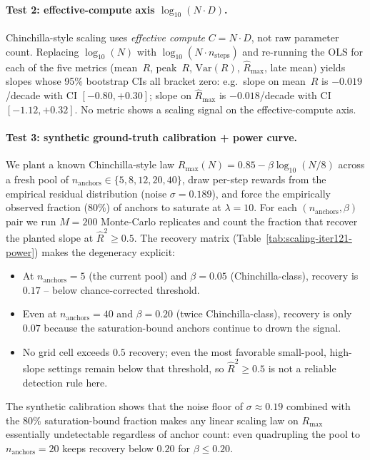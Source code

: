 \documentclass{article}
\providecommand{\tableref}[1]{Table~\ref{#1}}
\begin{document}
\paragraph{Test 2: effective-compute axis $\log_{10}(N \cdot D)$.}
\label{par:scaling-iter121-effcomp}
Chinchilla-style scaling uses \emph{effective compute}
$C = N \cdot D$, not raw parameter count.  Replacing $\log_{10}(N)$
with $\log_{10}(N \cdot n_{\text{steps}})$ and re-running the OLS
for each of the five metrics (mean~$R$, peak~$R$, $\mathrm{Var}(R)$,
$\hat R_{\max}$, late mean) yields slopes whose 95\% bootstrap CIs
all bracket zero: e.g.\ slope on mean~$R$ is $-0.019$/decade with
CI $[-0.80, +0.30]$; slope on $\hat R_{\max}$ is $-0.018$/decade
with CI $[-1.12, +0.32]$.  No metric shows a scaling signal on the
effective-compute axis.

\paragraph{Test 3: synthetic ground-truth calibration + power curve.}
\label{par:scaling-iter121-power}
We plant a known Chinchilla-style law
$R_{\max}(N) = 0.85 - \beta \log_{10}(N/8)$
across a fresh pool of $n_{\text{anchors}} \in \{5,8,12,20,40\}$,
draw per-step rewards from the empirical residual distribution
(noise $\sigma = 0.189$), and force the empirically observed
fraction ($80\%$) of anchors to saturate at $\lambda = 10$.  For each
$(n_{\text{anchors}}, \beta)$ pair we run $M = 200$ Monte-Carlo
replicates and count the fraction that recover the planted slope
at $\hat R^2 \ge 0.5$.  The recovery matrix
(\tableref{tab:scaling-iter121-power}) makes the degeneracy
explicit:
\begin{itemize}
  \item At $n_{\text{anchors}} = 5$ (the current pool) and
    $\beta = 0.05$ (Chinchilla-class), recovery is $0.17$ -- below
    chance-corrected threshold.
  \item Even at $n_{\text{anchors}} = 40$ and $\beta = 0.20$ (twice
    Chinchilla-class), recovery is only $0.07$ because the
    saturation-bound anchors continue to drown the signal.
  \item No grid cell exceeds $0.5$ recovery; even the most favorable
    small-pool, high-slope settings remain below that threshold, so
    $\hat R^2 \ge 0.5$ is not a reliable detection rule here.
\end{itemize}
The synthetic calibration shows that the noise floor of
$\sigma \approx 0.19$ combined with the $80\%$ saturation-bound
fraction makes any linear scaling law on $R_{\max}$ essentially
undetectable regardless of anchor count: even quadrupling the pool
to $n_{\text{anchors}} = 20$ keeps recovery below $0.20$ for
$\beta \le 0.20$.
\end{document}
